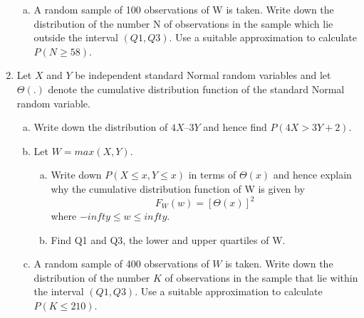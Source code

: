 \documentclass[a4paper,12pt]{article}
\begin{document}
\begin{enumerate}
\begin{enumerate}[(a)]
\item A random sample of 100 observations of W is taken. Write down the distribution of the number N of observations in the sample which lie outside the interval $(Q1, Q3)$. Use a suitable approximation to calculate $P(N \geq 58)$.


\end{enumerate}

\item Let $X$ and $Y$ be independent standard Normal random variables and let $\Theta(.)$ denote the cumulative distribution function of the standard Normal random variable.
\begin{enumerate}[(a)]
\item Write down the distribution of $4X – 3Y$ and hence find $P(4X > 3Y + 2)$.

\item  Let $W = max(X, Y)$.

\begin{enumerate}[(a)]
\item Write down $P(X \leq x, Y \leq x)$ in terms of $\Theta(x)$ and hence explain why the cumulative distribution function of W is given by
$$ F_{W}(w) = \left[  \Theta(x) \right]^{2} $$ where $-infty \leq w \leq infty$.

\item  Find Q1 and Q3, the lower and upper quartiles of W.
\end{enumerate}
\item  A random sample of 400 observations of $W$ is taken. Write down the distribution of the number $K$ of observations in the sample that lie within the interval $(Q1, Q3)$. Use a suitable approximation to calculate $P(K \leq 210)$.
\end{enumerate}


\end{enumerate}
\end{document}
